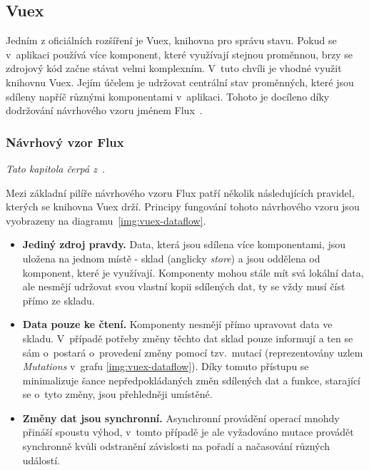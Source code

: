 \subsection{Vuex}
Jedním z oficiálních rozšíření je Vuex, knihovna pro správu stavu. Pokud se v~aplikaci používá více komponent, které využívají stejnou proměnnou, brzy se zdrojový kód začne stávat velmi komplexním. 
V~tuto chvíli je vhodné využit knihovnu Vuex. Jejím účelem je udržovat centrální stav proměnných, které jsou sdíleny napříč různými komponentami v~aplikaci. Tohoto je docíleno díky dodržování návrhového vzoru jménem Flux~\cite{bib:vuex-doc}. 


\subsubsection*{Návrhový vzor Flux}
\emph{Tato kapitola čerpá z~\cite{bib:vuex-guide}}.

Mezi základní pilíře návrhového vzoru Flux patří několik následujících pravidel, kterých se knihovna Vuex drží. Principy fungování tohoto návrhového vzoru jsou vyobrazeny na diagramu~\ref{img:vuex-dataflow}.

\begin{itemize}
    \item \textbf{Jediný zdroj pravdy.} Data, která jsou sdílena více komponentami, jsou uložena na jednom místě - sklad (anglicky \emph{store}) a jsou oddělena od komponent, které je využívají. Komponenty mohou stále mít svá lokální data, ale nesmějí udržovat svou vlastní kopii sdílených dat, ty se vždy musí číst přímo ze skladu.
    \item \textbf{Data pouze ke čtení.} Komponenty nesmějí přímo upravovat data ve skladu. V~případě potřeby změny těchto dat sklad pouze informují a ten se sám o~postará o~provedení změny pomocí tzv.~mutací (reprezentovány uzlem \emph{Mutations} v~grafu \ref{img:vuex-dataflow}). Díky tomuto přístupu se minimalizuje šance nepředpokládaných změn sdílených dat a funkce, starající se o~tyto změny, jsou přehledněji umístěné.
    \item \textbf{Změny dat jsou synchronní.} Asynchronní provádění operací mnohdy přináší spoustu výhod, v~tomto případě je ale vyžadováno mutace provádět synchronně kvůli odstranění závislosti na pořadí a načasování různých událostí.
\end{itemize}

